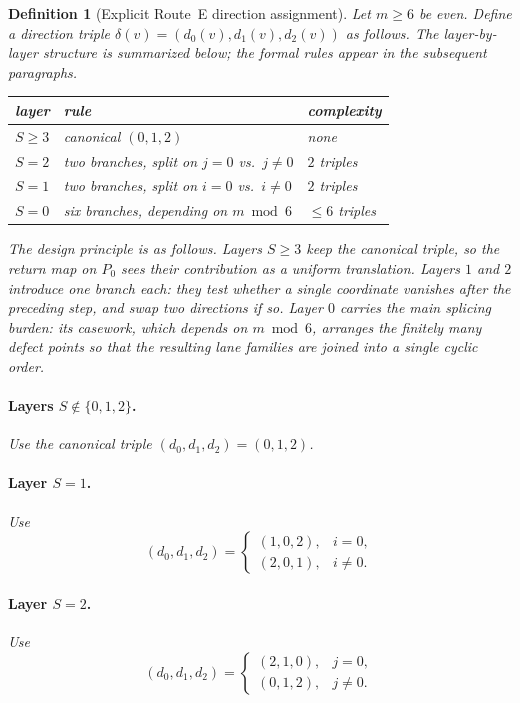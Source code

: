 \documentclass[11pt]{article}
\newtheorem{definition}{Definition}
\begin{document}
\begin{definition}[Explicit Route~E direction assignment]\label{def:routeE}
Let $m\ge 6$ be even. Define a direction triple $\delta(v)=(d_0(v),d_1(v),d_2(v))$ as follows.
The layer-by-layer structure is summarized below; the formal rules appear in the subsequent paragraphs.

\smallskip
\begin{center}
\footnotesize
\begin{tabular}{@{}lll@{}}
\toprule
layer & rule & complexity \\
\midrule
$S\ge 3$ & canonical $(0,1,2)$ & none \\
$S=2$ & two branches, split on $j=0$ vs.\ $j\ne 0$ & $2$ triples \\
$S=1$ & two branches, split on $i=0$ vs.\ $i\ne 0$ & $2$ triples \\
$S=0$ & six branches, depending on $m\bmod 6$ & $\le 6$ triples \\
\bottomrule
\end{tabular}
\end{center}
\smallskip

\noindent
The design principle is as follows.
Layers $S\ge 3$ keep the canonical triple, so the return map on $P_0$ sees their contribution as a uniform translation.
Layers $1$ and $2$ introduce one branch each: they test whether a single coordinate vanishes after the preceding step, and swap two directions if so.
Layer $0$ carries the main splicing burden: its casework, which depends on $m\bmod 6$, arranges the finitely many defect points so that the resulting lane families are joined into a single cyclic order.

\paragraph{Layers $S\notin\{0,1,2\}$.}
Use the canonical triple $(d_0,d_1,d_2)=(0,1,2)$.

\paragraph{Layer $S=1$.}
Use
\[
(d_0,d_1,d_2)=
\begin{cases}
(1,0,2), & i=0,\\
(2,0,1), & i\ne 0.
\end{cases}
\]

\paragraph{Layer $S=2$.}
Use
\[
(d_0,d_1,d_2)=
\begin{cases}
(2,1,0), & j=0,\\
(0,1,2), & j\ne 0.
\end{cases}
\]


\end{definition}
\end{document}
